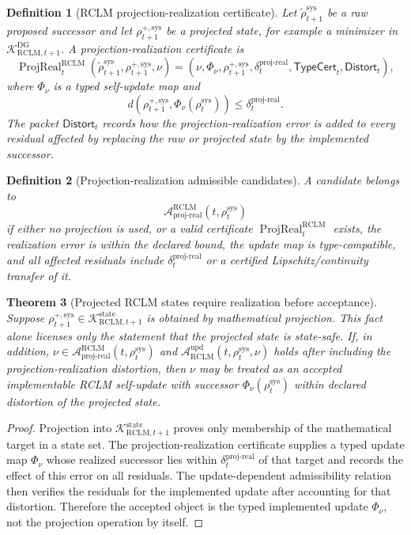 \documentclass[11pt,a4paper]{article}
\newtheorem{theorem}{Theorem}[section]
\newtheorem{definition}[theorem]{Definition}
\newcommand{\Acal}{\mathcal A}
\newcommand{\Kcal}{\mathcal K}
\newcommand{\RCLM}{\mathrm{RCLM}}
\newcommand{\DG}{\mathrm{DG}}
\newcommand{\sys}{\mathrm{sys}}
\newcommand{\state}{\mathrm{state}}
\newcommand{\upd}{\mathrm{upd}}
\newcommand{\ProjReal}{\operatorname{ProjReal}}
\begin{document}
\begin{definition}[RCLM projection-realization certificate]
\label{def:rclm-projection-realization-certificate}
Let \(\widetilde\rho_{t+1}^{\sys}\) be a raw proposed successor and let \(\rho_{t+1}^{+,\sys}\) be a projected state, for example a minimizer in \(\Kcal_{\RCLM,t+1}^{\DG}\).  A projection-realization certificate is
\[
\ProjReal_t^{\RCLM}(\widetilde\rho_{t+1}^{\sys},\rho_{t+1}^{+,\sys},\nu)
=
(\nu,\Phi_\nu,\rho_{t+1}^{+,\sys},\delta_t^{\mathrm{proj\mbox{-}real}},\mathsf{TypeCert}_t,\mathsf{Distort}_t),
\]
where \(\Phi_\nu\) is a typed self-update map and
\[
d(\rho_{t+1}^{+,\sys},\Phi_\nu(\rho_t^{\sys}))
\le
\delta_t^{\mathrm{proj\mbox{-}real}}.
\]
The packet \(\mathsf{Distort}_t\) records how the projection-realization error is added to every residual affected by replacing the raw or projected state by the implemented successor.
\end{definition}

\begin{definition}[Projection-realization admissible candidates]
\label{def:rclm-projection-realization-admissible}
A candidate belongs to
\[
\Acal_{\mathrm{proj\mbox{-}real}}^{\RCLM}(t,\rho_t^{\sys})
\]
if either no projection is used, or a valid certificate \(\ProjReal_t^{\RCLM}\) exists, the realization error is within the declared bound, the update map is type-compatible, and all affected residuals include \(\delta_t^{\mathrm{proj\mbox{-}real}}\) or a certified Lipschitz/continuity transfer of it.
\end{definition}

\begin{theorem}[Projected RCLM states require realization before acceptance]
\label{thm:rclm-projection-realization}
Suppose \(\rho_{t+1}^{+,\sys}\in\Kcal_{\RCLM,t+1}^{\state}\) is obtained by mathematical projection.  This fact alone licenses only the statement that the projected state is state-safe.  If, in addition, \(\nu\in\Acal_{\mathrm{proj\mbox{-}real}}^{\RCLM}(t,\rho_t^{\sys})\) and \(\Acal_{\RCLM}^{\upd}(t,\rho_t^{\sys},\nu)\) holds after including the projection-realization distortion, then \(\nu\) may be treated as an accepted implementable RCLM self-update with successor \(\Phi_\nu(\rho_t^{\sys})\) within declared distortion of the projected state.
\end{theorem}

\begin{proof}
Projection into \(\Kcal_{\RCLM,t+1}^{\state}\) proves only membership of the mathematical target in a state set.  The projection-realization certificate supplies a typed update map \(\Phi_\nu\) whose realized successor lies within \(\delta_t^{\mathrm{proj\mbox{-}real}}\) of that target and records the effect of this error on all residuals.  The update-dependent admissibility relation then verifies the residuals for the implemented update after accounting for that distortion.  Therefore the accepted object is the typed implemented update \(\Phi_\nu\), not the projection operation by itself.
\end{proof}
\end{document}
